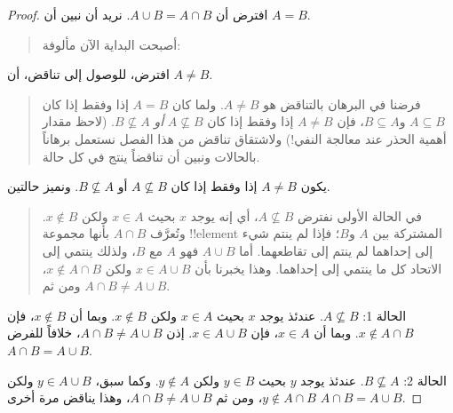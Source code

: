 \documentclass[../../../include/open-logic-section]{subfiles}
\begin{document}
\begin{proof}
  افترض أن $A \cup B = A \cap B$. نريد أن نبين أن $A = B$.
  \begin{quote}
    أصبحت البداية الآن مألوفة:
  \end{quote}
  افترض، للوصول إلى تناقض، أن $A \neq B$.
  \begin{quote}
    فرضنا في البرهان بالتناقض هو $A \neq B$. ولما كان $A = B$ إذا
    وفقط إذا كان $A \subseteq B$ و$B \subseteq A$، فإن
    $A \neq B$ إذا وفقط إذا كان $A \nsubseteq B$ \emph{أو}
    $B \nsubseteq A$. (لاحظ مقدار أهمية الحذر عند معالجة النفي!{})
    ولاشتقاق تناقض من هذا الفصل نستعمل برهاناً بالحالات ونبين أن تناقضاً
    ينتج في كل حالة.
  \end{quote}
  يكون $A \neq B$ إذا وفقط إذا كان $A \nsubseteq B$ أو
  $B \nsubseteq A$. ونميز حالتين.
  \begin{quote}
    في الحالة الأولى نفترض $A \nsubseteq B$، أي إنه يوجد $x$ بحيث
    $x \in A$ ولكن $x \notin B$. وتُعرَّف $A \cap B$ بأنها مجموعة
    !!{element} المشتركة بين $A$ و$B$؛ فإذا لم ينتم شيء إلى إحداهما لم
    ينتم إلى تقاطعهما. أما $A \cup B$ فهو $A$ مع $B$، ولذلك ينتمي إلى
    الاتحاد كل ما ينتمي إلى إحداهما. وهذا يخبرنا بأن
    $x \in A \cup B$ ولكن $x \notin A \cap B$، ومن ثم
    $A \cap B \neq A \cup B$.
  \end{quote}

  الحالة 1: $A \nsubseteq B$. عندئذ يوجد $x$ بحيث $x \in A$ ولكن
  $x \notin B$. وبما أن $x \notin B$، فإن $x \notin A \cap B$.
  وبما أن $x \in A$، فإن $x \in A \cup B$. إذن
  $A \cap B \neq A \cup B$، خلافاً للفرض
  $A \cap B = A \cup B$.

  الحالة 2: $B \nsubseteq A$. عندئذ يوجد $y$ بحيث $y \in B$ ولكن
  $y \notin A$. وكما سبق، $y \in A \cup B$ ولكن
  $y \notin A \cap B$، ومن ثم $A \cap B \neq A \cup B$، وهذا يناقض
  مرة أخرى $A \cap B = A \cup B$.
\end{proof}
\end{document}
